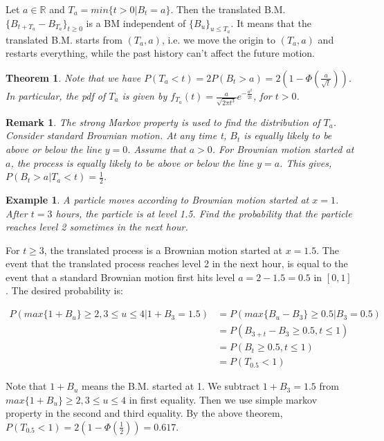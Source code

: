 \documentclass[12pt]{article}
\newtheorem{theorem}{Theorem}
\newtheorem*{remark}{Remark}
\newtheorem{example}{Example}
\begin{document}
Let $a \in \mathbb{R}$ and $T_a = min\{t > 0 | B_t = a\}$. Then the translated B.M. $\{B_{t+T_a} - B_{T_a}\}_{t\geq 0}$ is a BM independent of $\{B_u\}_{u\leq T_a}$. It means that the translated B.M. starts from $(T_a, a)$, i.e. we move the origin to $(T_a, a)$ and restarts everything, while the past history can't affect the future motion.

\begin{theorem}
    Note that we have $P(T_a < t) = 2P(B_t > a) = 2(1-\Phi(\frac{a}{\sqrt{t}}))$.
    \\In particular, the pdf of $T_a$ is given by $f_{T_a}(t)=\frac{a}{\sqrt{2\pi t^3}}e^{-\frac{a^2}{2t}}$, for $t > 0$.
\end{theorem}

\begin{remark}
    The strong Markov property is used to find the distribution of $T_a$. Consider standard Brownian motion. At any time t, $B_t$ is equally likely to be above or below the line $y = 0$. Assume that $a > 0$. For Brownian motion started at $a$, the process is equally likely to be above or below the line $y = a$. This gives, $P(B_t > a | T_a < t) = \frac{1}{2}$. 
\end{remark}

\begin{example}
    A particle moves according to Brownian motion started at $x = 1$. After $t = 3$ hours, the particle is at level 1.5. Find the probability that the particle reaches level 2 sometimes in the next hour.
\end{example}

\noindent For $t \geq 3$, the translated process is a Brownian motion started at $x = 1.5$. The event that the translated process reaches level 2 in the next hour, is equal to the event that a standard Brownian motion first hits level $a = 2 - 1.5 = 0.5$ in $[0, 1]$. The desired probability is:
\begin{center}
    \begin{align*}
        P(max\{1+B_u\} \geq 2, 3 \leq u \leq 4 | 1 + B_3 = 1.5) & = P(max\{B_u - B_3\} \geq 0.5 | B_3 = 0.5) \\
        & = P(B_{3+t} - B_3 \geq 0.5, t \leq 1)\\
        & = P(B_t \geq 0.5, t \leq 1) \\
        & = P(T_{0.5} < 1)
    \end{align*}
\end{center}

\noindent Note that $1 + B_u$ means the B.M. started at 1. We subtract $1 + B_3 = 1.5$ from $max\{1+B_u\} \geq 2, 3 \leq u \leq 4$ in first equality. Then we use simple markov property in the second and third equality. By the above theorem, $P(T_{0.5} < 1) = 2(1 - \Phi(\frac{1}{2})) = 0.617$.
\end{document}
